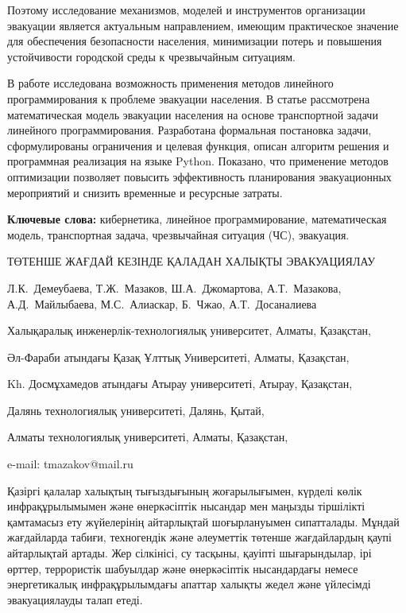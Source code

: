 Поэтому исследование механизмов, моделей и инструментов организации
эвакуации является актуальным направлением, имеющим практическое
значение для обеспечения безопасности населения, минимизации потерь и
повышения устойчивости городской среды к чрезвычайным ситуациям.

В работе исследована возможность применения методов линейного
программирования к проблеме эвакуации населения. В статье рассмотрена
математическая модель эвакуации населения на основе транспортной задачи
линейного программирования. Разработана формальная постановка задачи,
сформулированы ограничения и целевая функция, описан алгоритм решения и
программная реализация на языке Python. Показано, что применение методов
оптимизации позволяет повысить эффективность планирования эвакуационных
мероприятий и снизить временные и ресурсные затраты.

{\bfseries Ключевые слова:} кибернетика, линейное программирование,
математическая модель, транспортная задача, чрезвычайная ситуация (ЧС),
эвакуация.

\begin{header}
ТӨТЕНШЕ ЖАҒДАЙ КЕЗІНДЕ ҚАЛАДАН ХАЛЫҚТЫ ЭВАКУАЦИЯЛАУ

Л.К.~Демеубаева,
Т.Ж.~Мазаков\envelope,
Ш.А.~Джомартова,
А.Т.~Мазакова,
А.Д.~Майлыбаева,
М.С.~Алиаскар,
Б.~Чжао,
А.Т.~Досаналиева
\end{header}

\begin{affil}
Халықаралық инженерлік-технологиялық университет, Алматы, Қазақстан,

Әл-Фараби атындағы Қазақ Ұлттық Университеті, Алматы, Қазақстан,

Kh. Досмұхамедов атындағы Атырау университеті, Атырау, Қазақстан,

Далянь технологиялық университеті, Далянь, Қытай,

Алматы технологиялық университеті, Алматы, Қазақстан,

e-mail: tmazakov@mail.ru
\end{affil}

Қазіргі қалалар халықтың тығыздығының жоғарылығымен, күрделі көлік
инфрақұрылымымен және өнеркәсіптік нысандар мен маңызды тіршілікті
қамтамасыз ету жүйелерінің айтарлықтай шоғырлануымен сипатталады. Мұндай
жағдайларда табиғи, техногендік және әлеуметтік төтенше жағдайлардың
қаупі айтарлықтай артады. Жер сілкінісі, су тасқыны, қауіпті
шығарындылар, ірі өрттер, террористік шабуылдар және өнеркәсіптік
нысандардағы немесе энергетикалық инфрақұрылымдағы апаттар халықты жедел
және үйлесімді эвакуациялауды талап етеді.

